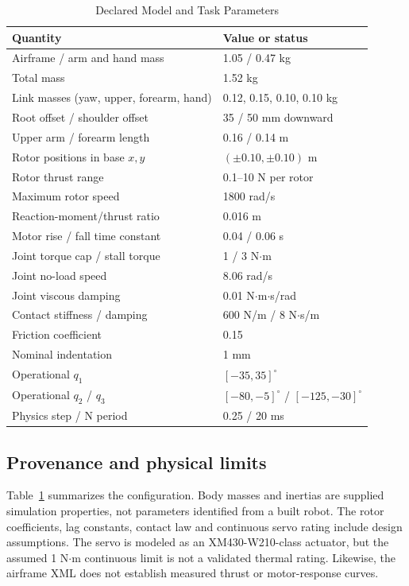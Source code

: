 \documentclass[conference]{IEEEtran}
\begin{document}
\begin{table}[t]
\caption{Declared Model and Task Parameters}
\label{tab:parameters}
\centering\footnotesize
\begin{tabular}{p{}p{}}
\hline
Quantity & Value or status\\\hline
Airframe / arm and hand mass & 1.05 / 0.47 kg\\
Total mass & 1.52 kg\\
Link masses (yaw, upper, forearm, hand) & 0.12, 0.15, 0.10, 0.10 kg\\
Root offset / shoulder offset & 35 / 50 mm downward\\
Upper arm / forearm length & 0.16 / 0.14 m\\
Rotor positions in base $x,y$ & $(\pm0.10,\pm0.10)$ m\\
Rotor thrust range & 0.1--10 N per rotor\\
Maximum rotor speed & 1800 rad/s\\
Reaction-moment/thrust ratio & 0.016 m\\
Motor rise / fall time constant & 0.04 / 0.06 s\\
Joint torque cap / stall torque & 1 / 3 N$\cdot$m\\
Joint no-load speed & 8.06 rad/s\\
Joint viscous damping & 0.01 N$\cdot$m$\cdot$s/rad\\
Contact stiffness / damping & 600 N/m / 8 N$\cdot$s/m\\
Friction coefficient & 0.15\\
Nominal indentation & 1 mm\\
Operational $q_1$ & $[-35,35]^\circ$\\
Operational $q_2$ / $q_3$ & $[-80,-5]^\circ$ / $[-125,-30]^\circ$\\
Physics step / N period & 0.25 / 20 ms\\\hline
\end{tabular}
\end{table}

\subsection{Provenance and physical limits}
Table~\ref{tab:parameters} summarizes the configuration. Body masses and inertias are supplied simulation properties, not parameters identified from a built robot. The rotor coefficients, lag constants, contact law and continuous servo rating include design assumptions. The servo is modeled as an XM430-W210-class actuator, but the assumed 1 N$\cdot$m continuous limit is not a validated thermal rating. Likewise, the airframe XML does not establish measured thrust or motor-response curves.
\end{document}
